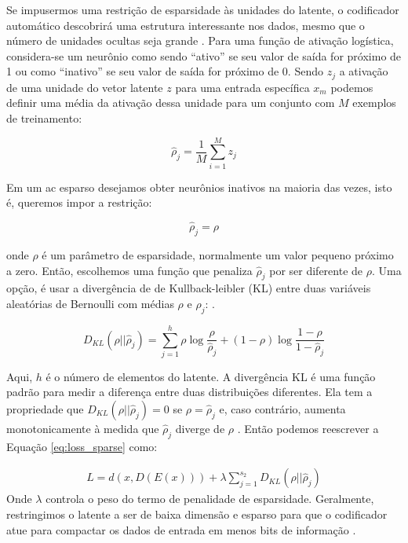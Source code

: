 Se impusermos uma restrição de esparsidade às unidades do latente, o codificador automático descobrirá uma estrutura interessante nos dados, mesmo que o número de unidades ocultas seja grande \cite{ng2011sparse}. 
Para uma função de ativação logística, considera-se um neurônio como sendo ``ativo'' se seu valor de saída for próximo de 1 ou como ``inativo'' se seu valor de saída for próximo de 0. Sendo $z_j$ a ativação de uma unidade do vetor latente ${z}$ para uma entrada específica $x_m$ podemos definir uma média da ativação dessa unidade para um conjunto com $M$ exemplos de treinamento:

\begin{equation}
\hat{\rho}_{j} = \frac{1}{M}\sum_{i=1}^M z_j
\end{equation}

Em um \acrshort{ac} esparso desejamos obter neurônios inativos na maioria das vezes, isto é, queremos impor a restrição:

\begin{equation}
\hat{\rho}_{j} = \rho
\end{equation}

onde ${\rho}$ é um parâmetro de esparsidade, normalmente um valor pequeno próximo a zero. 
Então, escolhemos uma função que penaliza $\hat{\rho}_{j}$ por ser diferente de ${\rho}$. Uma opção, é usar a divergência de 
de Kullback-leibler (KL) \cite{kullback1951information} entre duas variáveis aleatórias de Bernoulli com médias ${\rho}$ e $\hat{\rho}_{j}$: \cite{ng2011sparse}.  

\begin{equation}
D_{KL}(\rho||\hat{\rho}_{j}) = \sum_{j=1}^{h}\rho \log \frac{\rho}{\hat{\rho}_{j}} +(1-\rho)\log \frac{1- \rho}{1-\hat{\rho}_j}
\end{equation}

Aqui, $h$ é o número de elementos do latente.  A divergência KL é uma função padrão para medir a diferença entre duas distribuições diferentes. Ela tem a propriedade que $D_{KL}(\rho||\hat{\rho}_{j}) = 0$ se $\rho = \hat{\rho}_{j}$ e, caso contrário, aumenta monotonicamente à medida que $\hat{\rho}_{j}$ diverge de $\rho$ \cite{kullback1951information}. Então podemos reescrever a Equação \ref{eq:loss_sparse} como:

\begin{equation}
\label{eq:loss_sparse2}
\begin{aligned}
L = d({x},D(E({x}))) + \lambda \sum_{j=1}^{s_2} D_{KL}(\rho||\hat{\rho}_{j}) 
\end{aligned}
\end{equation}
Onde $\lambda$ controla o peso do termo de penalidade de esparsidade. Geralmente, restringimos o latente a ser de baixa dimensão e esparso para que o codificador atue para compactar os dados de entrada em menos bits de informação \cite{FrancoisDeepLearning}.

